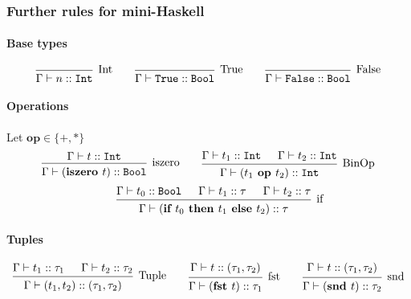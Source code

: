 \subsubsection{Further rules for mini-Haskell}
\paragraph{Base types}
\[
    \begin{prooftree}
        \infer0[Int]{\Gamma \vdash n :: \texttt{Int}}
    \end{prooftree}
    \qquad
    \begin{prooftree}
        \infer0[True]{\Gamma \vdash \texttt{True} :: \texttt{Bool}}
    \end{prooftree}
    \qquad
    \begin{prooftree}
        \infer0[False]{\Gamma \vdash \texttt{False} :: \texttt{Bool}}
    \end{prooftree}
\]

\paragraph{Operations}
Let $\textbf{op} \in \{ +, * \}$
\[
    \begin{prooftree}
        \hypo{\Gamma \vdash t :: \texttt{Int}}
        \infer1[iszero]{\Gamma \vdash (\textbf{iszero } t) :: \texttt{Bool}}
    \end{prooftree}
    \qquad
    \begin{prooftree}
        \hypo{\Gamma \vdash t_1 :: \texttt{Int}}
        \hypo{\Gamma \vdash t_2 :: \texttt{Int}}
        \infer2[BinOp]{\Gamma \vdash (t_1 \textbf{ op } t_2) :: \texttt{Int}}
    \end{prooftree}
\]
\[
    \qquad
    \begin{prooftree}
        \hypo{\Gamma \vdash t_0 :: \texttt{Bool}}
        \hypo{\Gamma \vdash t_1 :: \tau}
        \hypo{\Gamma \vdash t_2 :: \tau}
        \infer3[if]{\Gamma \vdash (\textbf{if } t_0 \textbf{ then } t_1 \textbf{ else } t_2) :: \tau}
    \end{prooftree}
\]

\paragraph{Tuples}
\[
    \begin{prooftree}
        \hypo{\Gamma \vdash t_1 :: \tau_1}
        \hypo{\Gamma \vdash t_2 :: \tau_2}
        \infer2[Tuple]{\Gamma \vdash (t_1, t_2) :: (\tau_1, \tau_2)}
    \end{prooftree}
    \qquad
    \begin{prooftree}
        \hypo{\Gamma \vdash t :: (\tau_1, \tau_2)}
        \infer1[fst]{\Gamma \vdash (\textbf{fst } t) :: \tau_1}
    \end{prooftree}
    \qquad
    \begin{prooftree}
        \hypo{\Gamma \vdash t :: (\tau_1, \tau_2)}
        \infer1[snd]{\Gamma \vdash (\textbf{snd } t) :: \tau_2}
    \end{prooftree}
\]

